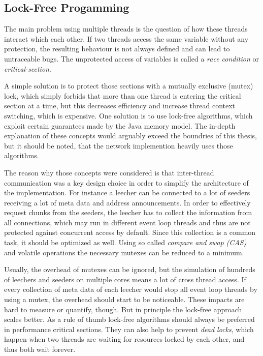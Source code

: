 \subsection{Lock-Free Progamming}
\label{subsec:lockfree}
The main problem using multiple threads is the question of how these threads interact which each other. If two threads access the same variable without any protection, the resulting behaviour is not always defined and can lead to untraceable bugs. The unprotected access of variables is called a \emph{race condition} or \emph{critical-section}.

A simple solution is to protect those sections with a mutually exclusive (mutex) lock, which simply forbids that more than one thread is entering the critical section at a time, but this decreases efficiency and increase thread context switching, which is expensive. One solution is to use lock-free algorithms, which exploit certain guarantees made by the Java memory model. The in-depth explanation of these concepts would arguably exceed the boundries of this thesis, but it should be noted, that the network implemention heavily uses those algorithms.

The reason why those concepts were considered is that inter-thread communication was a key design choice in order to simplify the architecture of the implementation. For instance a leecher can be connected to a lot of seeders receiving a lot of meta data and address announcements. In order to effectively request chunks from the seeders, the leecher has to collect the information from all connections, which may run in different event loop threads and thus are not protected against concurrent access by default. Since this collection is a common task, it should be optimized as well. Using so called \emph{compare and swap (CAS)} and volatile operations the necessary mutexes can be reduced to a minimum. 

Usually, the overhead of mutexes can be ignored, but the simulation of hundreds of leechers and seeders on multiple cores means a lot of cross thread access. If every collection of meta data of each leecher would stop all event loop threads by using a mutex, the overhead should start to be noticeable. These impacts are hard to measure or quantify, though. But in principle the lock-free approach scales better. As a rule of thumb lock-free algorithms should always be preferred in performance critical sections. They can also help to prevent \emph{dead locks}, which happen when two threads are waiting for resources locked by each other, and thus both wait forever.

